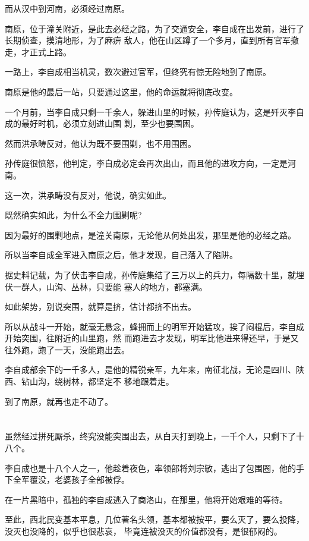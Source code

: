 \documentclass[11pt,a4paper,onecolumn]{article}
\begin{document}
而从汉中到河南，必须经过南原。

南原，位于潼关附近，是此去必经之路，为了交通安全，李自成在出发前，进行了长期侦查，摸清地形，为了麻痹
敌人，他在山区蹲了一个多月，直到所有官军撤走，才正式上路。

一路上，李自成相当机灵，数次避过官军，但终究有惊无险地到了南原。

南原是他的最后一站，只要通过这里，他的命运就将彻底改变。

一个月前，当李自成只剩一千余人，躲进山里的时候，孙传庭认为，这是歼灭李自成的最好时机，必须立刻进山围
剿，至少也要围困。

然而洪承畴反对，他认为既不要围剿，也不用围困。

孙传庭很愤怒，他判定，李自成必定会再次出山，而且他的进攻方向，一定是河南。

这一次，洪承畴没有反对，他说，确实如此。

既然确实如此，为什么不全力围剿呢?

因为最好的围剿地点，是潼关南原，无论他从何处出发，那里是他的必经之路。

所以当李自成全军进入南原之后，他才发现，自己落入了陷阱。

据史料记载，为了伏击李自成，孙传庭集结了三万以上的兵力，每隔数十里，就埋伏一群人，山沟、丛林，只要能
塞人的地方，都塞满。

如此架势，别说突围，就算是挤，估计都挤不出去。

所以从战斗一开始，就毫无悬念，蜂拥而上的明军开始猛攻，挨了闷棍后，李自成开始突围，往附近的山里跑，然
而跑进去才发现，明军比他进来得还早，于是又往外跑，跑了一天，没能跑出去。

李自成部余下的一千多人，是他的精锐亲军，九年来，南征北战，无论是四川、陕西、钻山沟，绕树林，都坚定不
移地跟着走。

到了南原，就再也走不动了。

\section[\thesection]{}

虽然经过拼死厮杀，终究没能突围出去，从白天打到晚上，一千个人，只剩下了十八个。

李自成也是十八个人之一，他趁着夜色，率领部将刘宗敏，逃出了包围圈，他的手下全军覆没，老婆孩子全部被俘。

在一片黑暗中，孤独的李自成逃入了商洛山，在那里，他将开始艰难的等待。

至此，西北民变基本平息，几位著名头领，基本都被按平，要么灭了，要么投降，没灭也没降的，似乎也很悲哀，
毕竟连被没灭的价值都没有，是很郁闷的。
\end{document}
